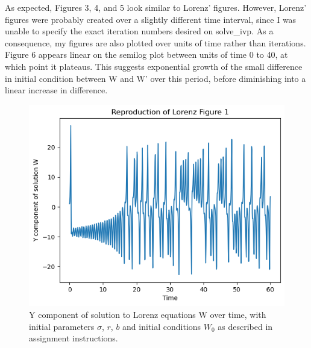 \documentclass{article}
\begin{document}
\begin{multicols}{2}
As expected, Figures 3, 4, and 5 look similar to Lorenz' figures. However, Lorenz' figures were probably created over a slightly different time interval, since I was unable to specify the exact iteration numbers desired on solve\_ivp. As a consequence, my figures are also plotted over units of time rather than iterations. Figure 6 appears linear on the semilog plot between units of time 0 to 40, at which point it plateaus. This suggests exponential growth of the small difference in initial condition between W and W' over this period, before diminishing into a linear increase in difference. 

\begin{figure} [H]
    \centering
    \includegraphics[width=1.0\linewidth]{Assignment 3 Images/download (2).png}
    \caption{Y component of solution to Lorenz equations W over time, with initial parameters $\sigma$, $r$, $b$ and initial conditions $W_0$ as described in assignment instructions.}
    \label{fig:enter-label}
\end{figure}


\end{multicols}
\end{document}
